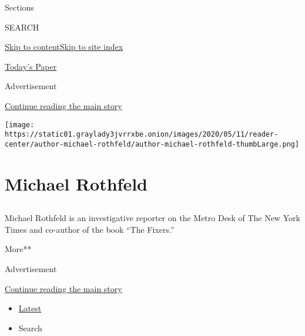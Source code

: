 Sections

SEARCH

\protect\hyperlink{site-content}{Skip to
content}\protect\hyperlink{site-index}{Skip to site index}

\href{https://myaccount.nytimes3xbfgragh.onion/auth/login?response_type=cookie\&client_id=vi}{}

\href{https://www.nytimes3xbfgragh.onion/section/todayspaper}{Today's
Paper}

Advertisement

\protect\hyperlink{after-top}{Continue reading the main story}

\texttt{[image: https://static01.graylady3jvrrxbe.onion/images/2020/05/11/reader-center/author-michael-rothfeld/author-michael-rothfeld-thumbLarge.png]}

\hypertarget{michael-rothfeld}{%
\section{Michael Rothfeld}\label{michael-rothfeld}}

\subsection{}

Michael Rothfeld is an investigative reporter on the Metro Desk of The
New York Times and co-author of the book ``The Fixers.''

More**

Advertisement

\protect\hyperlink{after-mid1}{Continue reading the main story}

\begin{itemize}
\tightlist
\item
  \protect\hyperlink{stream-panel}{Latest}
\item
  Search
\end{itemize}


